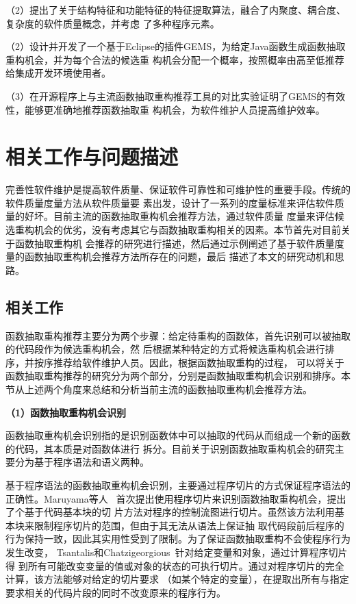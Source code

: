 （2）提出了关于结构特征和功能特征的特征提取算法，融合了内聚度、耦合度、复杂度的软件质量概念，并考虑
了多种程序元素。

（2）设计并开发了一个基于Eclipse的插件GEMS，为给定Java函数生成函数抽取重构机会，并为每个合法的候选重
构机会分配一个概率，按照概率由高至低推荐给集成开发环境使用者。

（3）在开源程序上与主流函数抽取重构推荐工具的对比实验证明了GEMS的有效性，能够更准确地推荐函数抽取重
构机会，为软件维护人员提高维护效率。

\section{相关工作与问题描述}
完善性软件维护是提高软件质量、保证软件可靠性和可维护性的重要手段。传统的软件质量度量方法从软件质量要
素出发，设计了一系列的度量标准来评估软件质量的好坏。目前主流的函数抽取重构机会推荐方法，通过软件质量
度量来评估候选重构机会的优劣，没有考虑其它与函数抽取重构相关的因素。本节首先对目前关于函数抽取重构机
会推荐的研究进行描述，然后通过示例阐述了基于软件质量度量的函数抽取重构机会推荐方法所存在的问题，最后
描述了本文的研究动机和思路。

\subsection{相关工作}
函数抽取重构推荐主要分为两个步骤：给定待重构的函数体，首先识别可以被抽取的代码段作为候选重构机会，然
后根据某种特定的方式将候选重构机会进行排序，并按序推荐给软件维护人员。因此，根据函数抽取重构的过程，
可以将关于函数抽取重构推荐的研究分为两个部分，分别是函数抽取重构机会识别和排序。本节从上述两个角度来总结和分析当前主流的函数抽取重构机会推荐方法。

\textbf{（1）函数抽取重构机会识别}

函数抽取重构机会识别指的是识别函数体中可以抽取的代码从而组成一个新的函数的代码，其本质是对函数体进行
拆分。目前关于识别函数抽取重构机会的研究主要分为基于程序语法和语义两种。

基于程序语法的函数抽取重构机会识别，主要通过程序切片的方式保证程序语法的正确性。Maruyama等人
~\cite{maruyama2001automated}首次提出使用程序切片来识别函数抽取重构机会，提出了个基于代码基本块的切
片方法对程序的控制流图进行切片。虽然该方法利用基本块来限制程序切片的范围，但由于其无法从语法上保证抽
取代码段前后程序的行为保持一致，因此其实用性受到了限制。为了保证函数抽取重构不会使程序行为发生改变，
Tsantalis和Chatzigeorgious~\cite{tsantalis2011identification}针对给定变量和对象，通过计算程序切片得
到所有可能改变变量的值或对象的状态的可执行切片。通过对程序切片的完全计算，该方法能够对给定的切片要求
（如某个特定的变量），在提取出所有与指定要求相关的代码片段的同时不改变原来的程序行为。

